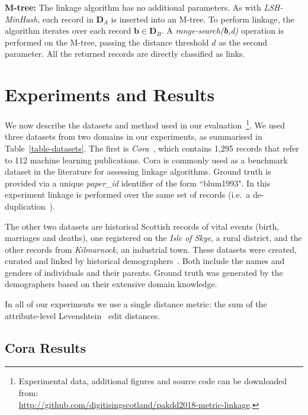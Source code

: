 \documentclass{llncs}
\begin{document}
\textbf{M-tree:} The linkage algorithm has no additional parameters. As
with \emph{LSH-MinHash}, each record in $\mathbf{D}_A$ is inserted into
an M-tree. To perform linkage, the algorithm iterates over each record
$\mathbf{b} \in \mathbf{D}_B$. A \emph{range-search(\textbf{b},d)}
operation is performed on the M-tree, passing the distance threshold $d$
as the second parameter. All the returned records are directly
classified as links.


\section{Experiments and Results}
\label{sec-exp}

We now describe the datasets and method used in our
evaluation~\footnote{Experimental data, additional figures and source
code can be downloaded from: \\
\url{http://github.com/digitisingscotland/pakdd2018-metric-linkage}.}.
We used three datasets from two domains in our experiments, as
summarised in Table~\ref{table-datasets}. The first is
\emph{Cora}~\cite{Cora2017}, which contains 1,295 records that refer to
112 machine learning publications. Cora is commonly used as a benchmark
dataset in the literature for assessing linkage algorithms. Ground truth
is provided via a unique \emph{paper\_id} identifier of the form
``blum1993". In this experiment linkage is performed over the same set
of records (i.e.\ a de-duplication~\cite{Chr12}).

The other two datasets are historical Scottish records of vital events
(birth, marriages and deaths), one registered on the \emph{Isle of
Skye}, a rural district, and the other records from \emph{Kilmarnock},
an industrial town. These datasets were created, curated and linked by
historical demographers~\cite{reid2006,reid2002}. Both include the names
and genders of individuals and their parents. Ground truth was generated
by the demographers based on their extensive domain knowledge.

In all of our experiments we use a single distance metric: the sum of
the attribute-level Levenshtein~\cite{Levenshtein66} edit distances.


\subsection{Cora Results}
\end{document}
